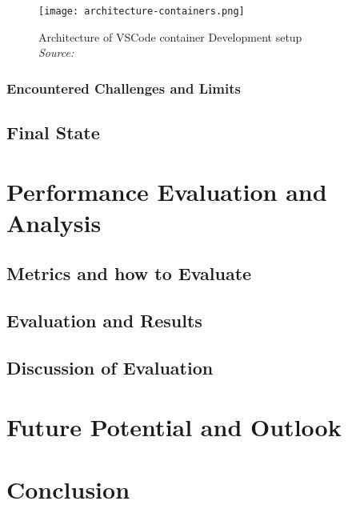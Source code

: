 \documentclass[12pt, a4paper]{article}
\begin{document}
        \begin{figure}[]
            \centering
            \texttt{[image: architecture-containers.png]}
            \caption{Architecture of \ac{VSCode} container Development setup \\\textit{Source:~\cite{vscodedevcontainer}}}\label{fig::vscodecontainer}
        \end{figure}

        \subsubsection{Encountered Challenges and Limits}
    \subsection{Final State}\label{sec::final}


\section{Performance Evaluation and Analysis}\label{sec::eval}
    \subsection{Metrics and how to Evaluate}
    \subsection{Evaluation and Results}
    \subsection{Discussion of Evaluation}

\section{Future Potential and Outlook}\label{sec::outlook}
\section{Conclusion}\label{sec::conclusion}
\end{document}
